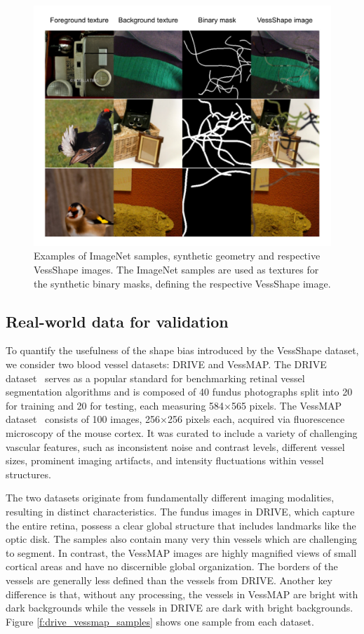\documentclass[%
reprint,
nofootinbib,
 amsmath,amssymb,
aps,
superscriptaddress,
showkeys,
longbibliography
]{revtex4-1}
\begin{document}
\begin{figure}[tbp]
    \centering
    \includegraphics[width=\columnwidth]{figures/results/vessshape_sample.pdf}
    \caption{Examples of ImageNet samples, synthetic geometry and respective VessShape images. The ImageNet samples are used as textures for the synthetic binary masks, defining the respective VessShape image.}
    \label{f:vessshape_sample}
\end{figure}

\subsection{Real-world data for validation}

To quantify the usefulness of the shape bias introduced by the VessShape dataset, we consider two blood vessel datasets: DRIVE and VessMAP. The DRIVE dataset~\cite{Staal2004} serves as a popular standard for benchmarking retinal vessel segmentation algorithms and is composed of 40 fundus photographs split into 20 for training and 20 for testing, each measuring 584×565 pixels. The VessMAP dataset~\cite{viana2025new} consists of 100 images, 256×256 pixels each, acquired via fluorescence microscopy of the mouse cortex. It was curated to include a variety of challenging vascular features, such as inconsistent noise and contrast levels, different vessel sizes, prominent imaging artifacts, and intensity fluctuations within vessel structures.

The two datasets originate from fundamentally different imaging modalities, resulting in distinct characteristics. The fundus images in DRIVE, which capture the entire retina, possess a clear global structure that includes landmarks like the optic disk. The samples also contain many very thin vessels which are challenging to segment. In contrast, the VessMAP images are highly magnified views of small cortical areas and have no discernible global organization. The borders of the vessels are generally less defined than the vessels from DRIVE. Another key difference is that, without any processing, the vessels in VessMAP are bright with dark backgrounds while the vessels in DRIVE are dark with bright backgrounds. Figure \ref{f:drive_vessmap_samples} shows one sample from each dataset.
\end{document}
